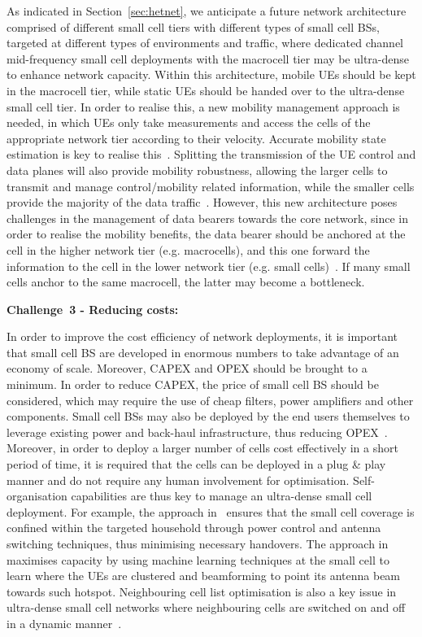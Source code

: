 \documentclass{IEEEtran}
\begin{document}
As indicated in Section~\ref{sec:hetnet},
we anticipate a future network architecture comprised of different small cell tiers with different types of small cell \acp{BS},
targeted at different types of environments and traffic,
where  dedicated channel mid-frequency small cell deployments with the macrocell tier may be ultra-dense to enhance network capacity.
Within this architecture,
mobile \acp{UE} should be kept in the macrocell tier,
while static \acp{UE} should be handed over to the ultra-dense small cell tier.
In order to realise this,
a new mobility management approach is needed,
in which \acp{UE} only take measurements and access the cells of the appropriate network tier according to their velocity.
Accurate mobility state estimation is key to realise this~\cite{Puttonen_ITNG_2009}.
Splitting the transmission of the \ac{UE} control and data planes will also provide mobility robustness,
allowing the larger cells to transmit and manage control/mobility related information,
while the smaller cells provide the majority of the data traffic~\cite{6477646}.
However, this new architecture poses challenges in the management of data bearers towards the core network,
since in order to realise the mobility benefits,
the data bearer should be anchored at the cell in the higher network tier (e.g. macrocells),
and this one forward the information to the cell in the lower network tier (e.g. small cells)~\cite{TR36842}.
If many small cells anchor to the same macrocell,
the latter may become a bottleneck.


{\bf Challenge~3 - Reducing costs:}

In order to improve the cost efficiency of network deployments,
it is important that small cell \ac{BS} are developed in enormous numbers to take advantage of an economy of scale.
Moreover, \ac{CAPEX} and \ac{OPEX} should be brought to a minimum.
In order to reduce \ac{CAPEX},
the price of small cell \ac{BS} should be considered,
which may require the use of cheap filters, power amplifiers and other components.
Small cell \acp{BS} may also be deployed by the end users themselves to leverage existing power and back-haul infrastructure,
thus reducing \ac{OPEX}~\cite{Claussen:07a}.
Moreover, in order to deploy a larger number of cells cost effectively in a short period of time,
it is required that the cells can be deployed in a plug \& play manner and do not require any human involvement for optimisation.
Self-organisation capabilities are thus key to manage an ultra-dense small cell deployment.
For example, the approach in~\cite{Claussen:09d} ensures that the small cell coverage is confined within the targeted household
through power control and antenna switching techniques,
thus minimising necessary handovers.
The approach in~\cite{6879477} maximises capacity by using machine learning techniques at the small cell to learn where the \acp{UE} are clustered
and beamforming to point its antenna beam towards such hotspot.
Neighbouring cell list optimisation is also a key issue in ultra-dense small cell networks where neighbouring cells are switched on and off in a dynamic manner~\cite{4531860}.
\end{document}
